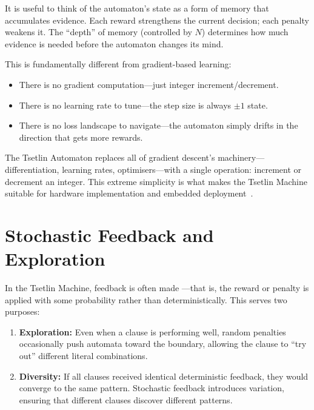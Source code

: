 It is useful to think of the automaton's state as a form of memory
that accumulates evidence. Each reward strengthens the current
decision; each penalty weakens it. The ``depth'' of memory (controlled
by $N$) determines how much evidence is needed before the automaton
changes its mind.

This is fundamentally different from gradient-based learning:
\begin{itemize}
  \item There is no gradient computation---just integer
    increment/decrement.
  \item There is no learning rate to tune---the step size is always
    $\pm 1$ state.
  \item There is no loss landscape to navigate---the automaton simply
    drifts in the direction that gets more rewards.
\end{itemize}

\begin{keyinsight}
The Tsetlin Automaton replaces all of gradient descent's
machinery---differentiation, learning rates, optimisers---with a
single operation: increment or decrement an integer. This extreme
simplicity is what makes the Tsetlin Machine suitable for
hardware implementation and embedded deployment~\cite{wheeldon2020pervasive}.
\end{keyinsight}


\section{Stochastic Feedback and Exploration}
\label{sec:stochastic}

In the Tsetlin Machine, feedback is often made
---that is, the reward or penalty is applied with
some probability rather than deterministically. This serves two
purposes:

\begin{enumerate}
  \item \textbf{Exploration:} Even when a clause is performing well,
    random penalties occasionally push automata toward the boundary,
    allowing the clause to ``try out'' different literal combinations.
  \item \textbf{Diversity:} If all clauses received identical
    deterministic feedback, they would converge to the same pattern.
    Stochastic feedback introduces variation, ensuring that different
    clauses discover different patterns.
\end{enumerate}

